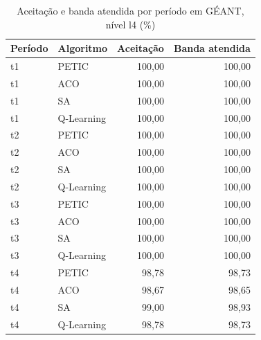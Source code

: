 \begin{table}[htb]
    \centering
    \scriptsize
    \caption{Aceitação e banda atendida por período em GÉANT, nível l4 (\%)}
    \label{tab:periodos-geant-l4}
    \begin{tabular}{llrr}
        \hline
        Período & Algoritmo & Aceitação & Banda atendida \\
        \hline
        t1 & PETIC & 100,00 & 100,00 \\
        t1 & ACO & 100,00 & 100,00 \\
        t1 & SA & 100,00 & 100,00 \\
        t1 & Q-Learning & 100,00 & 100,00 \\
        t2 & PETIC & 100,00 & 100,00 \\
        t2 & ACO & 100,00 & 100,00 \\
        t2 & SA & 100,00 & 100,00 \\
        t2 & Q-Learning & 100,00 & 100,00 \\
        t3 & PETIC & 100,00 & 100,00 \\
        t3 & ACO & 100,00 & 100,00 \\
        t3 & SA & 100,00 & 100,00 \\
        t3 & Q-Learning & 100,00 & 100,00 \\
        t4 & PETIC & 98,78 & 98,73 \\
        t4 & ACO & 98,67 & 98,65 \\
        t4 & SA & 99,00 & 98,93 \\
        t4 & Q-Learning & 98,78 & 98,73 \\
        \hline
    \end{tabular}
\end{table}

